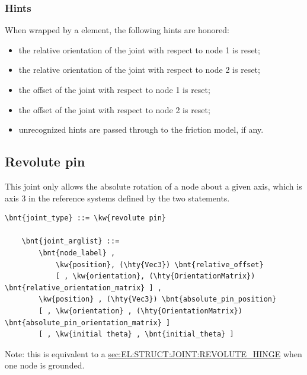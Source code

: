 \subsubsection{Hints}
When wrapped by a  element, the following hints are honored:
\begin{itemize}
\item {} the relative orientation of the joint
with respect to node 1 is reset;
\item {} the relative orientation of the joint
with respect to node 2 is reset;
\item {} the offset of the joint
with respect to node 1 is reset;
\item {} the offset of the joint
with respect to node 2 is reset;
\item unrecognized hints are passed through to the friction model,
if any.
\end{itemize}




\subsection{Revolute pin}
\label{sec:EL:STRUCT:JOINT:REVOLUTE_PIN}
This joint only allows the absolute rotation of a node about
a given axis, which is axis 3 in the reference systems defined 
by the two  statements.
\begin{Verbatim}[commandchars=\\\{\}]
    \bnt{joint_type} ::= \kw{revolute pin}

    \bnt{joint_arglist} ::= 
        \bnt{node_label} ,
            \kw{position}, (\hty{Vec3}) \bnt{relative_offset}
            [ , \kw{orientation}, (\hty{OrientationMatrix}) \bnt{relative_orientation_matrix} ] ,
        \kw{position} , (\hty{Vec3}) \bnt{absolute_pin_position}
        [ , \kw{orientation} , (\hty{OrientationMatrix}) \bnt{absolute_pin_orientation_matrix} ]
        [ , \kw{initial theta} , \bnt{initial_theta} ]
\end{Verbatim}
Note: this is equivalent to a
\hyperref{\kw{revolute hinge}}{\kw{revolute hinge} (see Section~}{)}{sec:EL:STRUCT:JOINT:REVOLUTE_HINGE}
when one node is grounded.

